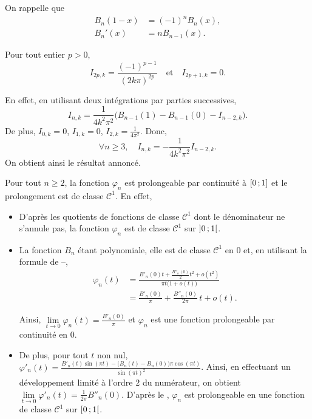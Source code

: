 On rappelle que 
\begin{align*}
B_n(1 - x) &= (-1)^n B_n(x),\\
B_n'(x) &= n B_{n-1}(x).
\end{align*}

\begin{elemsolution}
\begin{reponses}
\item Pour tout entier $p > 0$,
\[
I_{2p, k} = \frac{(-1)^{p-1}}{(2 k \pi)^{2p}} \quad \text{et} \quad I_{2p+1,k} = 0.
\]

En effet, en utilisant deux intégrations par parties successives,
\[
I_{n,k} = \frac{1}{4k^2 \pi^2} \big(B_{n-1}(1) - B_{n-1}(0) - I_{n-2, k} \big).
\]
De plus, $I_{0,k} = 0$, $I_{1,k} = 0$, $I_{2,k} = \frac{1}{4 \pi^2}$. Donc,
\[
\forall n \geqslant 3,\quad I_{n,k} = - \frac{1}{4 k^2 \pi^2}I_{n-2, k}.
\]
On obtient ainsi le résultat annoncé.
\item Pour tout $n \geqslant 2$, la fonction $\varphi_n$ est prolongeable par continuité à $\left[0\,;1\right]$ et le prolongement est de classe $\mathscr{C}^1$. En effet,

\begin{itemize}
\item D'après les quotients de fonctions de classe $\mathscr{C}^1$ dont le dénominateur ne s'annule pas, la fonction $\varphi_n$ est de classe $\mathscr{C}^1$ sur $\left]0\,;1\right[$.

\item La fonction $B_n$ étant polynomiale, elle est de classe $\mathscr{C}^1$ en $0$ et, en utilisant la formule de --,
\begin{align*}
\varphi_n(t) &= \frac{B'_n(0)t + \frac{B''_n(0)}{2}t^2 + o(t^2)}{\pi t \big(1 + o(t) \big)} \\
&= \frac{B'_n(0)}{\pi} + \frac{B''_n(0)}{2 \pi} \, t + o(t).
\end{align*}

Ainsi, $\lim\limits_{t \to 0} \varphi_n(t) = \frac{B'_n(0)}{\pi}$ et $\varphi_n$ est une fonction prolongeable par continuité en $0$.

\item
%
De plus, pour tout $t$ non nul, $\displaystyle \varphi'_n(t) = \frac{B'_n(t) \sin(\pi t) - \big(B_n(t) - B_n(0) \big) \pi \cos(\pi t)}{\sin(\pi t)^2}$. Ainsi, en effectuant un développement limité à l'ordre $2$ du numérateur, on obtient $\lim\limits_{t \to 0} \varphi'_n(t) = \frac{1}{2 \pi} B''_n(0)$.
D'après le , $\varphi_n$ est prolongeable en une fonction de classe $\mathscr{C}^1$ sur $\left[0\,;1\right[$.


\end{itemize}
\end{reponses}
\end{elemsolution}
